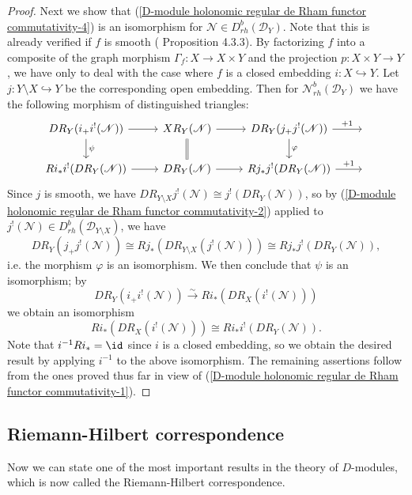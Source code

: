 \begin{proof}
Next we show that (\ref{D-module holonomic regular de Rham functor commutativity-4}) is an isomorphism for $\mathscr{N}\in D^b_{rh}(\mathscr{D}_Y)$. Note that this is already verified if $f$ is smooth (\cite{Hotta} Proposition 4.3.3). By factorizing $f$ into a composite of the graph morphism $\Gamma_f:X\to X\times Y$ and the projection $p:X\times Y\to Y$, we have only to deal with the case where $f$ is a closed embedding $i:X\hookrightarrow Y$. Let $j:Y\setminus X\hookrightarrow Y$ be the corresponding open embedding. Then for $\mathscr{N}^b_{rh}(\mathscr{D}_Y)$ we have the following morphism of distinguished triangles:
\[\begin{tikzcd}
DR_Y(i_+i^!(\mathscr{N}))\ar[r]\ar[d,"\psi"]&XR_Y(\mathscr{N})\ar[r]\ar[d,equal]&DR_Y(j_+j^!(\mathscr{N}))\ar[r,"+1"]\ar[d,"\varphi"]&{}\\
Ri_*i^!(DR_Y(\mathscr{N}))\ar[r]&DR_Y(\mathscr{N})\ar[r]&Rj_*j^!(DR_Y(\mathscr{N}))\ar[r,"+1"]&{}
\end{tikzcd}\]
Since $j$ is smooth, we have $DR_{Y\setminus X}j^!(\mathscr{N})\cong j^!(DR_Y(\mathscr{N}))$, so by (\ref{D-module holonomic regular de Rham functor commutativity-2}) applied to $j^!(\mathscr{N})\in D^b_{rh}(\mathscr{D}_{Y\setminus X})$, we have
\[DR_Y(j_+j^!(\mathscr{N}))\cong Rj_*(DR_{Y\setminus X}(j^!(\mathscr{N})))\cong Rj_*j^!(DR_Y(\mathscr{N})),\]
i.e. the morphism $\varphi$ is an isomorphism. We then conclude that $\psi$ is an isomorphism; by 
\[DR_Y(i_+i^!(\mathscr{N}))\stackrel{\sim}{\to} Ri_*(DR_X(i^!(\mathscr{N})))\]
we obtain an isomorphism
\[Ri_*(DR_X(i^!(\mathscr{N})))\cong Ri_*i^!(DR_Y(\mathscr{N})).\]
Note that $i^{-1}Ri_*=\id$ since $i$ is a closed embedding, so we obtain the desired result by applying $i^{-1}$ to the above isomorphism. The remaining assertions follow from the ones proved thus far in view of (\ref{D-module holonomic regular de Rham functor commutativity-1}).
\end{proof}

\subsection{Riemann-Hilbert correspondence}
Now we can state one of the most important results in the theory of $D$-modules, which is now called the Riemann-Hilbert correspondence.

